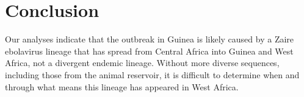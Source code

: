 \documentclass[11pt,oneside,letterpaper]{article}
\begin{document}
\section*{Conclusion}
Our analyses indicate that the outbreak in Guinea is likely caused by a Zaire ebolavirus lineage that has spread from Central Africa into Guinea and West Africa, not a divergent endemic lineage.
Without more diverse sequences, including those from the animal reservoir, it is difficult to determine when and through what means this lineage has appeared in West Africa.



\end{document}
